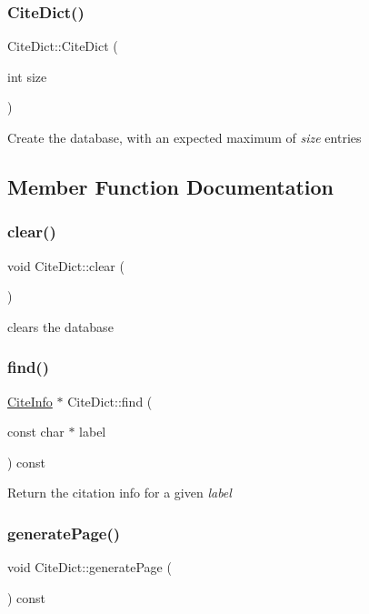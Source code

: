 \subsubsection{\texorpdfstring{CiteDict()}{CiteDict()}}
{\footnotesize\ttfamily Cite\+Dict\+::\+Cite\+Dict (\begin{DoxyParamCaption}\item[{int}]{size }\end{DoxyParamCaption})}

Create the database, with an expected maximum of {\itshape size} entries 

\subsection{Member Function Documentation}
\mbox{\label{class_cite_dict_a35183cd5038e60f747dd9ecd6bb64f73}} 
\subsubsection{\texorpdfstring{clear()}{clear()}}
{\footnotesize\ttfamily void Cite\+Dict\+::clear (\begin{DoxyParamCaption}{ }\end{DoxyParamCaption})}

clears the database \mbox{\label{class_cite_dict_a6aadfa5a48551c3f34c64108f2e287ef}} 
\subsubsection{\texorpdfstring{find()}{find()}}
{\footnotesize\ttfamily \mbox{\hyperlink{struct_cite_info}{Cite\+Info}} $\ast$ Cite\+Dict\+::find (\begin{DoxyParamCaption}\item[{const char $\ast$}]{label }\end{DoxyParamCaption}) const}

Return the citation info for a given {\itshape label} \mbox{\label{class_cite_dict_a3c940a5ed5a06d90d9dc5471e900bb77}} 
\subsubsection{\texorpdfstring{generatePage()}{generatePage()}}
{\footnotesize\ttfamily void Cite\+Dict\+::generate\+Page (\begin{DoxyParamCaption}{ }\end{DoxyParamCaption}) const}


